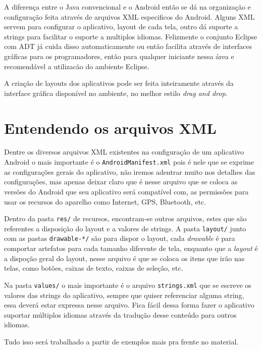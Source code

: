 \documentclass[a4paper,12pt,brazil,doubleside]{book}
\begin{document}
A diferença entre o Java convencional e o Android então se dá na organização e configuração feita através de arquivos XML especificos do Android. Alguns XML servem para configurar o aplicativo, layout de cada tela, outro dá suporte a strings para facilitar o suporte a multiplos idiomas.
Felizmente o conjunto Eclipse com ADT já cuida disso automaticamente ou então facilita através de interfaces gráficas para os programadores, então para qualquer iniciante nessa área e recomendável a utilizacão do ambiente Eclipse.

A criação de layouts dos aplicativos pode ser feita inteiramente através da interface gráfica disponível no ambiente, no melhor estilo \textit{drag and drop}. 

\section{Entendendo os arquivos XML}
Dentre os diversos arquivos XML existentes na configuração de um aplicativo Android o mais importante é o \texttt{\textcolor{mygreen}{AndroidManifest.xml}} pois é nele que se exprime as configurações gerais do aplicativo, não iremos adentrar muito nos detalhes das configurações, mas apenas deixar claro que é nesse arquivo que se coloca as versões do Android que seu aplicativo será compatível com, as permissões para usar os recursos do aparelho como Internet, GPS, Bluetooth, etc. 

Dentro da pasta \texttt{\textcolor{mygreen}{res/}} de recursos, encontram-se outros arquivos, estes que são referentes a disposição do layout e a valores de strings. A pasta \texttt{\textcolor{mygreen}{layout/}} junto com as pastas \texttt{\textcolor{mygreen}{drawable-*/}} são para dispor o layout, cada \textit{drawable} é para comportar artefatos para cada tamanho diferente de tela, enquanto que a \textit{layout} é a dispoção geral do layout, nesse arquivo é que se coloca os itens que irão nas telas, como botões, caixas de texto, caixas de seleção, etc.

Na pasta \texttt{\textcolor{mygreen}{values/}} o mais importante é o arquivo \texttt{\textcolor{mygreen}{strings.xml}} que se escreve os valores das strings do aplicativo, sempre que quiser referenciar alguma string, essa deverá estar expressa nesse arquivo. Fica fácil dessa forma fazer o aplicativo suportar múltiplos idiomas através da tradução desse conteúdo para outros idiomas. 

Tudo isso será trabalhado a partir de exemplos mais pra frente no material.
\end{document}
